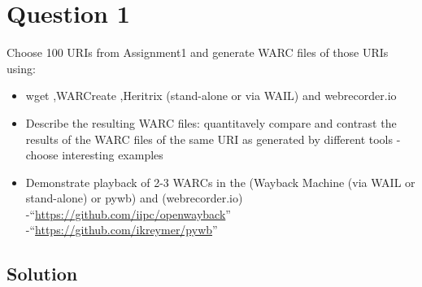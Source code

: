 


\section{Question 1}
\label{part1}

Choose 100 URIs from Assignment1 and generate WARC files of those URIs using:
	
\begin{itemize}
\item wget
	  ,WARCreate
	  ,Heritrix (stand-alone or via WAIL)
	  and webrecorder.io
\item Describe the resulting WARC files: quantitavely compare and contrast the results of the 
	  WARC files of the same URI as generated by different tools
	  	- choose interesting examples
\item Demonstrate playback of 2-3 WARCs in the (Wayback Machine (via WAIL or stand-alone) or pywb) 
	 and (webrecorder.io)
	  -``\url{https://github.com/iipc/openwayback}''
	  -``\url{https://github.com/ikreymer/pywb}''
\end{itemize}
\subsection{Solution}

